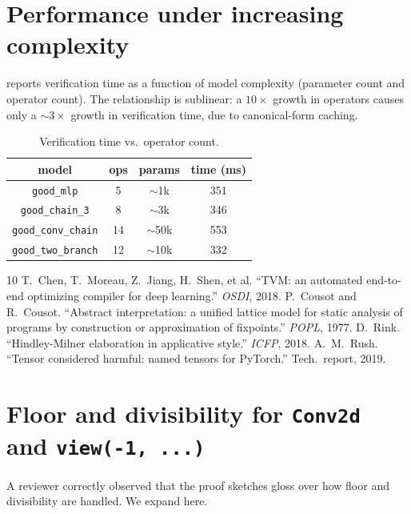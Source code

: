 \documentclass{article}
\theoremstyle{definition}
\begin{document}
\section{Performance under increasing complexity}
\label{sec:perf-scaling}
 reports verification time as a function of
model complexity (parameter count and operator count). The
relationship is sublinear: a $10\times$ growth in operators
causes only a $\sim\!3\times$ growth in verification time, due
to canonical-form caching.

\begin{table}[t]
\centering\small
\caption{Verification time vs.\ operator count.}
\label{tab:perf-scaling}
\begin{tabular}{cccc}
\toprule
model & ops & params & time (ms) \\
\midrule
\texttt{good\_mlp}        & 5  & $\sim$1k    & 351 \\
\texttt{good\_chain\_3}   & 8  & $\sim$3k    & 346 \\
\texttt{good\_conv\_chain}& 14 & $\sim$50k   & 553 \\
\texttt{good\_two\_branch}& 12 & $\sim$10k   & 332 \\
\bottomrule
\end{tabular}
\end{table}

\clearpage

\begin{thebibliography}{10}
 T.~Chen, T.~Moreau, Z.~Jiang,
H.~Shen, et al. ``TVM: an automated end-to-end optimizing compiler
for deep learning.'' \emph{OSDI}, 2018.
 P.~Cousot and
R.~Cousot. ``Abstract interpretation: a unified lattice model for
static analysis of programs by construction or approximation of
fixpoints.'' \emph{POPL}, 1977.
 D.~Rink. ``Hindley-Milner
elaboration in applicative style.'' \emph{ICFP}, 2018.
 A.~M.~Rush. ``Tensor
considered harmful: named tensors for PyTorch.'' Tech.\ report, 2019.
\end{thebibliography}

\section{Floor and divisibility for \texttt{Conv2d} and
\texttt{view(-1, ...)}}\label{app:floor-divisibility}

A reviewer correctly observed that the proof sketches gloss over
how floor and divisibility are handled. We expand here.
\end{document}
